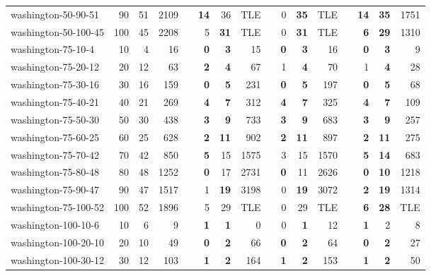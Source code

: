 \begin{table}[!ht]
{\begin{tabular}{lrrrrrrrrrrrlrrr}
washington-50-90-51 & 90 & 51 & 2109 &  & \textbf{14} & 36 & TLE &  & 0 & \textbf{35} & TLE &  & \textbf{14} & \textbf{35} & 1751 \\
washington-50-100-45 & 100 & 45 & 2208 &  & 5 & \textbf{31} & TLE &  & 0 & \textbf{31} & TLE &  & \textbf{6} & \textbf{29} & 1310 \\ \hline
washington-75-10-4 & 10 & 4 & 16 &  & \textbf{0} & \textbf{3} & 15 &  & \textbf{0} & \textbf{3} & 16 &  & \textbf{0} & \textbf{3} & 9 \\
washington-75-20-12 & 20 & 12 & 63 &  & \textbf{2} & \textbf{4} & 67 &  & 1 & \textbf{4} & 70 &  & 1 & \textbf{4} & 28 \\
washington-75-30-16 & 30 & 16 & 159 &  & \textbf{0} & \textbf{5} & 231 &  & \textbf{0} & \textbf{5} & 197 &  & \textbf{0} & \textbf{5} & 68 \\
washington-75-40-21 & 40 & 21 & 269 &  & \textbf{4} & \textbf{7} & 312 &  & \textbf{4} & \textbf{7} & 325 &  & \textbf{4} & \textbf{7} & 109 \\
washington-75-50-30 & 50 & 30 & 438 &  & \textbf{3} & \textbf{9} & 733 &  & \textbf{3} & \textbf{9} & 683 &  & \textbf{3} & \textbf{9} & 257 \\
washington-75-60-25 & 60 & 25 & 628 &  & \textbf{2} & \textbf{11} & 902 &  & \textbf{2} & \textbf{11} & 897 &  & \textbf{2} & \textbf{11} & 275 \\
washington-75-70-42 & 70 & 42 & 850 &  & \textbf{5} & 15 & 1575 &  & 3 & 15 & 1570 &  & \textbf{5} & \textbf{14} & 683 \\
washington-75-80-48 & 80 & 48 & 1252 &  & \textbf{0} & 17 & 2731 &  & \textbf{0} & 11 & 2626 &  & \textbf{0} & \textbf{10} & 1218 \\
washington-75-90-47 & 90 & 47 & 1517 &  & 1 & \textbf{19} & 3198 &  & 0 & \textbf{19} & 3072 &  & \textbf{2} & \textbf{19} & 1314 \\
washington-75-100-52 & 100 & 52 & 1896 &  & 5 & 29 & TLE &  & 0 & 29 & TLE &  & \textbf{6} & \textbf{28} & TLE \\ \hline
washington-100-10-6 & 10 & 6 & 9 &  & \textbf{1} & \textbf{1} & 0 &  & 0 & \textbf{1} & 12 &  & \textbf{1} & 2 & 8 \\
washington-100-20-10 & 20 & 10 & 49 &  & \textbf{0} & \textbf{2} & 66 &  & \textbf{0} & \textbf{2} & 64 &  & \textbf{0} & \textbf{2} & 27 \\
washington-100-30-12 & 30 & 12 & 103 &  & \textbf{1} & \textbf{2} & 164 &  & \textbf{1} & \textbf{2} & 153 &  & \textbf{1} & \textbf{2} & 50 \\

\end{tabular}}
\end{table}
